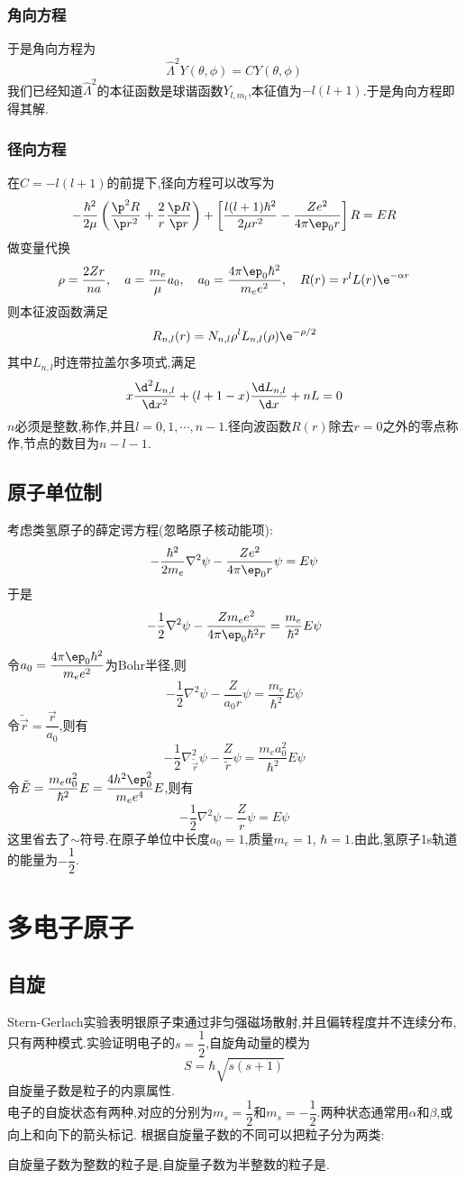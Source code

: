 \documentclass{ctexbook}
\begin{document}
\subsubsection{角向方程}
于是角向方程为
\[\hat{\Lambda}^2Y(\theta,\phi)=CY(\theta,\phi)\]
我们已经知道$\hat{\Lambda}^2$的本征函数是球谐函数$Y_{l,m_l}$,本征值为$-l(l+1)$.于是角向方程即得其解.
\subsubsection{径向方程}
在$C=-l(l+1)$的前提下,径向方程可以改写为
\[-\dfrac{\hbar^2}{2\mu}\left(\dfrac{\p^2 R}{\p r^2}+\dfrac{2}{r}\dfrac{\p R}{\p r}\right)+\left[\dfrac{l(l+1)\hbar^2}{2\mu r^2}-\dfrac{Ze^2}{4\pi\ep_0r}\right]R=ER\]
做变量代换
\[\rho=\dfrac{2Zr}{na},\quad a=\dfrac{m_e}{\mu}a_0,\quad a_0=\dfrac{4\pi\ep_0\hbar^2}{m_ee^2},\quad R(r)=r^l L(r)\e^{-\alpha r}\]
则本征波函数满足
\[R_{n,l}(r)=N_{n,l}\rho^l L_{n,l}(\rho)\e^{-\rho/2}\]
其中$L_{n,l}$时连带拉盖尔多项式,满足
\[x\dfrac{\d^2 L_{n,l}}{\d x^2}+(l+1-x)\dfrac{\d L_{n,l}}{\d x}+nL=0\]
$n$必须是整数,称作,并且$l=0,1,\cdots,n-1$.径向波函数$R(r)$除去$r=0$之外的零点称作,节点的数目为$n-l-1$.
\subsection{原子单位制}
考虑类氢原子的薛定谔方程(忽略原子核动能项):
\[-\dfrac{\hbar^2}{2m_e}\nabla^2\psi-\dfrac{Ze^2}{4\pi\ep_0 r}\psi=E\psi\]
于是
\[-\dfrac12\nabla^2\psi-\dfrac{Zm_e e^2}{4\pi\ep_0\hbar^2 r}=\dfrac{m_e}{\hbar^2}E\psi\]
令$a_0=\dfrac{4\pi\ep_0\hbar^2}{m_e e^2}$为Bohr半径,则
\[-\dfrac12\nabla^2\psi-\dfrac{Z}{a_0 r}\psi=\dfrac{m_e}{\hbar^2}E\psi\]
令$\tilde{\vec{r}}=\dfrac{\vec{r}}{a_0}$,则有
\[-\dfrac{1}{2}\nabla_{\tilde{\vec{r}}}^2\psi-\dfrac{Z}{\tilde{r}}\psi=\dfrac{m_e a_0^2}{\hbar^2}E\psi\]
令$\tilde{E}=\dfrac{m_e a_0^2}{\hbar^2}E=\dfrac{4h^2\ep_0^2}{m_e e^4}E$,则有
\[-\dfrac12\nabla^2\psi-\dfrac{Z}{r}\psi=E\psi\]
这里省去了$\sim$符号.在原子单位中长度$a_0=1$,质量$m_e=1$, $\hbar=1$.由此,氢原子1s轨道的能量为$-\dfrac12$.
\section{多电子原子}
\subsection{自旋}
Stern-Gerlach实验表明银原子束通过非匀强磁场散射,并且偏转程度并不连续分布,只有两种模式.实验证明电子的$s=\dfrac12$,自旋角动量的模为
\[S=\hbar\sqrt{s(s+1)}\]
自旋量子数是粒子的内禀属性.\\
\indent 电子的自旋状态有两种,对应的分别为$m_s=\dfrac12$和$m_s=-\dfrac12$.两种状态通常用$\alpha$和$\beta$,或向上和向下的箭头标记.
\indent 根据自旋量子数的不同可以把粒子分为两类:
\begin{definition}[费米子和玻色子]
	自旋量子数为整数的粒子是,自旋量子数为半整数的粒子是.
\end{definition}
\end{document}
